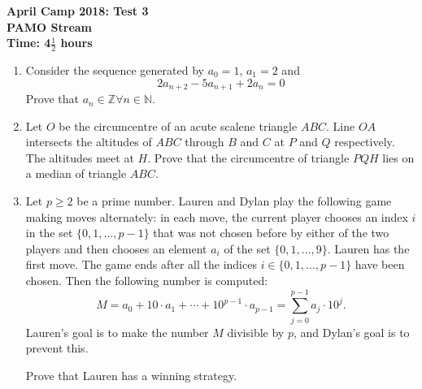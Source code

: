 \documentclass[a4paper,12pt]{article}
\begin{document}
\setcounter{page}{1}

\begin{center}
	\textbf{April Camp 2018: Test 3}\\
	\textbf{PAMO Stream}\\
	\textbf{Time: 4$\frac{1}{2}$ hours}
\end{center}

\begin{enumerate}
\vspace{0.2cm}

\item %
Consider the sequence generated by $a_0=1$, $a_1=2$ and 
\[2a_{n+2}-5a_{n+1}+2a_n =0\]
Prove that $a_n \in \mathbb{Z} \forall n \in \mathbb{N}$. 


\item %
Let $O$ be the circumcentre of an acute scalene triangle $ABC$. Line $OA$ intersects the altitudes of $ABC$ through $B$ and $C$ at $P$ and $Q$ respectively. The altitudes meet at $H$. Prove that the circumcentre of triangle $PQH$ lies on a median of triangle $ABC$.


\item %
Let $p \geq 2$ be a prime number. Lauren and Dylan play the following game making moves alternately: in each move, the current player chooses an index $i$ in the set $\{0, 1, \dotsc, p-1\}$ that was not chosen before by either of the two players and then chooses an element $a_i$ of the set $\{0, 1, \dotsc, 9\}$. Lauren has the first move. The game ends after all the indices $i \in \{0, 1, \dotsc, p-1\}$ have been chosen. Then the following number is computed:
\[ M = a_0 +10\cdot a_1 +\dotsb +10^{p-1} \cdot a_{p-1} = \sum_{j=0}^{p-1} a_j \cdot 10^j. \]
Lauren's goal is to make the number $M$ divisible by $p$, and Dylan's goal is to prevent this.

Prove that Lauren has a winning strategy.

\end{enumerate}
\end{document}
